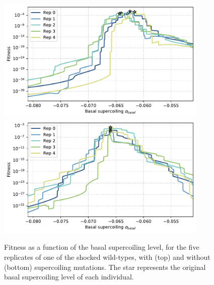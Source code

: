 \begin{figure}
\centering
\includegraphics[width=0.9\textwidth]{epistasis/img/with-sc/fitness_landscapes_evolved_wt_01_shuffle_00.pdf}
\includegraphics[width=0.9\textwidth]{epistasis/img/control/fitness_landscapes_evolved_wt_01_shuffle_00.pdf}
\caption[Supercoiling fitness landscapes after evolution after an environmental shock with and without supercoiling mutations]{Fitness as a function of the basal supercoiling level, for the five replicates of one of the shocked wild-types, with (top) and without (bottom) supercoiling mutations.
The star represents the original basal supercoiling level of each individual.}
\label{fig:epistasis:fitness-landscapes-evolved}
\end{figure}

